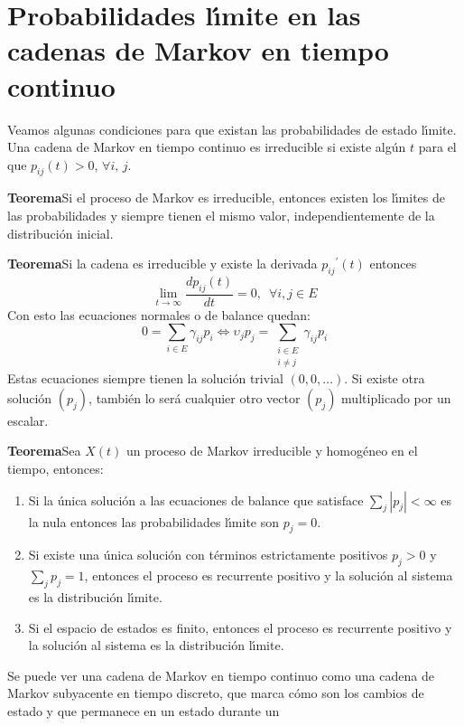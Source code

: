 \section{Probabilidades l\'{\i}mite en las cadenas de Markov en
tiempo continuo}
Veamos algunas condiciones para que existan las probabilidades de
estado l\'{\i}mite. Una cadena de Markov en tiempo continuo es
irreducible si existe alg\'{u}n $t$ para el que $p_{ij}(t)>0$,
$\forall i,\,j$.
\par
{\bf Teorema}\hfill\break Si el proceso de Markov es irreducible,
entonces existen los l\'{\i}mites de las probabilidades y siempre
tienen el mismo valor, independientemente de la distribuci\'{o}n
inicial.
\par
{\bf Teorema}\hfill\break Si la cadena es irreducible y existe la
derivada ${p_{ij}}^{\prime}(t)$ entonces
\[
\displaystyle\lim_{t \to \infty}\dfrac{dp_{ij}(t)}{dt}=0,\enspace
\forall i,j\in E
\]
Con esto las ecuaciones normales o de balance quedan:
\[
0=\displaystyle\sum_{i\in E}\gamma_{ij}p_i \Leftrightarrow
\upsilon_j p_j=\displaystyle\sum_{\begin{array}{l}i\in E\\[-5pt]i\neq j\end{array}}
\gamma_{ij}p_i
\]
Estas ecuaciones siempre tienen la soluci\'{o}n trivial
$(0,0,\ldots)$. Si existe otra soluci\'{o}n $(p_j)$, tambi\'{e}n lo ser\'{a}
cualquier otro vector $(p_j)$ multiplicado por un escalar.
\par
{\bf Teorema}\hfill\break Sea $X(t)$ un proceso de Markov
irreducible y homog\'{e}neo en el tiempo, entonces:
\begin{enumerate}
  \item Si la \'{u}nica soluci\'{o}n a las ecuaciones de balance que satisface
  $\displaystyle\sum_j |p_j|<\infty$ es la nula entonces
las probabilidades l\'{\i}mite son $p_j=0$.
  \item Si existe una \'{u}nica soluci\'{o}n con t\'{e}rminos estrictamente positivos
$p_j>0$ y $\displaystyle\sum_j p_j=1$, entonces el proceso es
recurrente positivo y la soluci\'{o}n al sistema es la distribuci\'{o}n
l\'{\i}mite.
  \item Si el espacio
de estados es finito, entonces el proceso es recurrente positivo
y la soluci\'{o}n al sistema es la distribuci\'{o}n l\'{\i}mite.
\end{enumerate}
Se puede ver una cadena de Markov en tiempo continuo como una
cadena de Markov subyacente en tiempo discreto, que marca c\'{o}mo
son los cambios de estado y que permanece en un estado durante un
